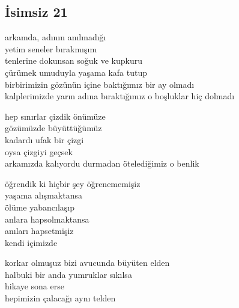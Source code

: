 \subsection{İsimsiz 21}

arkamda, adının anılmadığı \\
yetim seneler bırakmışım \\
tenlerine dokunsan soğuk ve kupkuru \\
çürümek umuduyla yaşama kafa tutup \\
birbirimizin gözünün içine baktığımız bir ay olmadı \\
kalplerimizde yarın adına bıraktığımız o boşluklar hiç dolmadı

\noindent\newline
hep sınırlar çizdik önümüze \\
gözümüzde büyüttüğümüz \\
kadardı ufak bir çizgi \\
oysa çizgiyi geçsek \\
arkamızda kalıyordu durmadan ötelediğimiz o benlik

\noindent\newline
öğrendik ki hiçbir şey öğrenememişiz \\
yaşama alışmaktansa \\
ölüme yabancılaşıp \\
anlara hapsolmaktansa \\
anıları hapsetmişiz \\
kendi içimizde

\noindent\newline
korkar olmuşuz bizi avucunda büyüten elden \\
halbuki bir anda yumruklar sıkılsa \\
hikaye sona erse \\
hepimizin çalacağı aynı telden